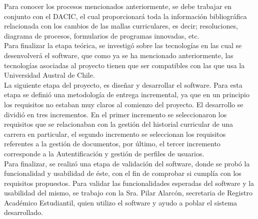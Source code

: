 Para conocer los procesos mencionados anteriormente, se debe trabajar en conjunto con el DACIC, el cual proporcionará toda la información bibliográfica relacionada con los cambios de las mallas curriculares, es decir; resoluciones, diagrama de procesos, formularios de programas innovadas, etc.
\\

Para finalizar la etapa teórica, se investigó sobre las tecnologías en las cual se desenvolverá el software, que como ya se ha mencionado anteriormente, las tecnologías asociadas al proyecto tienen que ser compatibles con las que usa la Universidad Austral de Chile.
\\


La siguiente etapa del proyecto, es diseñar y desarrollar el software. Para esta etapa se definió una metodología de entrega incremental, ya que en un principio los requisitos no estaban muy claros al comienzo del proyecto. El desarrollo se dividió en tres incrementos. En el primer incremento se seleccionaron los requisitos que se relacionaban con la gestión del historial curricular de una carrera en particular,  el segundo incremento se seleccionan los requisitos referentes a la gestión de documentos, por último, el tercer incremento  corresponde a la Autentificación y gestión de perfiles de usuarios.
\\

Para finalizar, se realizó una etapa de validación del software, donde se probó la funcionalidad y usabilidad de éste, con el fin de comprobar si cumplía con los requisitos propuestos. Para validar las funcionalidades esperadas del software y la usabilidad del mismo, se trabajo con la Sra. Pilar Alarcón, secretaria de Registro Académico Estudiantil, quien utilizo el software y ayudo a poblar el sistema desarrollado.

